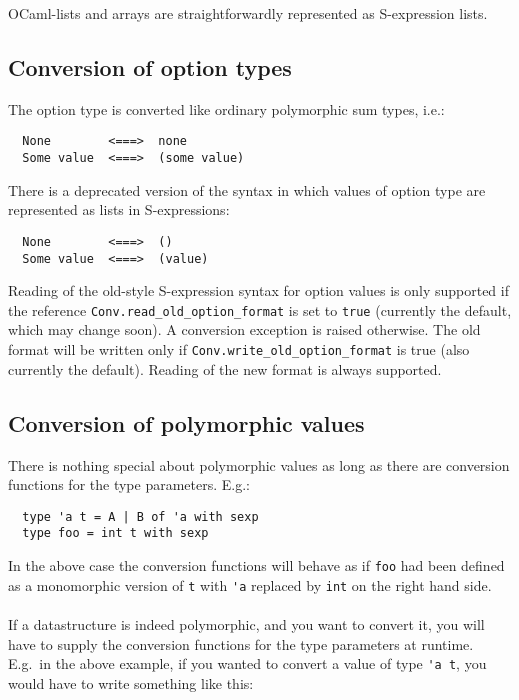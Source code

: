 \documentclass[a4paper]{article}
\begin{document}
OCaml-lists and arrays are straightforwardly represented as S-expression
lists.

\subsection{Conversion of option types}

The option type is converted like ordinary polymorphic sum types, i.e.:

\begin{verbatim}
  None        <===>  none
  Some value  <===>  (some value)
\end{verbatim}

There is a deprecated version of the syntax in which values of option
type are represented as lists in S-expressions:

\begin{verbatim}
  None        <===>  ()
  Some value  <===>  (value)
\end{verbatim}

Reading of the old-style S-expression syntax for option values is only
supported if the reference \verb=Conv.read_old_option_format= is set to
\verb=true= (currently the default, which may change soon).  A conversion
exception is raised otherwise.  The old format will be written only if
\verb=Conv.write_old_option_format= is true (also currently the default).
Reading of the new format is always supported.

\subsection{Conversion of polymorphic values}

There is nothing special about polymorphic values as long as there are
conversion functions for the type parameters.  E.g.:

\begin{verbatim}
  type 'a t = A | B of 'a with sexp
  type foo = int t with sexp
\end{verbatim}

In the above case the conversion functions will behave as if \verb=foo=
had been defined as a monomorphic version of \verb=t= with \verb='a=
replaced by \verb=int= on the right hand side.\\
\\
If a datastructure is indeed polymorphic, and you want to convert it,
you will have to supply the conversion functions for the type parameters
at runtime.  E.g.\ in the above example, if you wanted to convert a value
of type \verb='a t=, you would have to write something like this:
\end{document}
